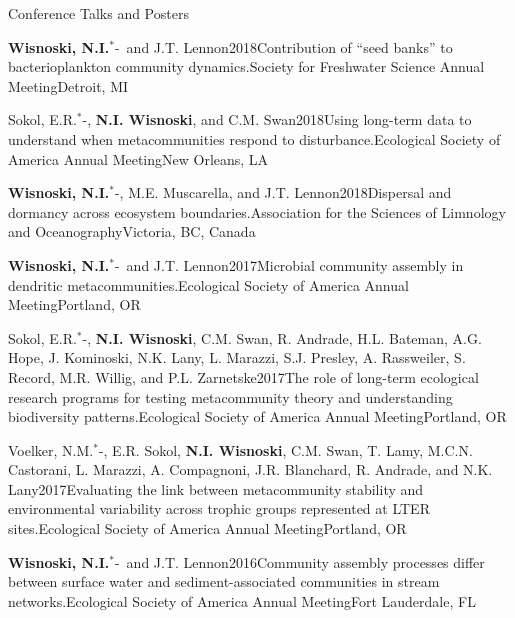 \documentclass{resume} %
\newcommand{\Star}{\ensuremath{^*}\kern-\scriptspace}
\begin{document}
\begin{rhangSection}{Conference Talks and Posters}
\begin{Presentation}{{\bf Wisnoski, N.I.}\Star\ and J.T. Lennon}{2018}{Contribution of \enquote{seed banks} to bacterioplankton community dynamics.}{Society for Freshwater Science Annual Meeting}{Detroit, MI}
\end{Presentation}
  
\begin{Presentation}{Sokol, E.R.\Star, {\bf N.I. Wisnoski}, and C.M. Swan}{2018}{Using long-term data to understand when metacommunities respond to disturbance.}{Ecological Society of America Annual Meeting}{New Orleans, LA}
\end{Presentation}

\begin{Presentation}{{\bf Wisnoski, N.I.}\Star, M.E. Muscarella, and J.T. Lennon}{2018}{Dispersal and dormancy across ecosystem boundaries.}{Association for the Sciences of Limnology and Oceanography}{Victoria, BC, Canada}
\end{Presentation}

\begin{Presentation}{{\bf Wisnoski, N.I.}\Star\ and J.T. Lennon}{2017}{Microbial community assembly in dendritic metacommunities.}{Ecological Society of America Annual Meeting}{Portland, OR}
\end{Presentation}
  
\begin{Presentation}{Sokol, E.R.\Star, {\bf N.I. Wisnoski}, C.M. Swan, R. Andrade, H.L. Bateman, A.G. Hope, J. Kominoski, N.K. Lany, L. Marazzi, S.J. Presley, A. Rassweiler, S. Record, M.R. Willig, and P.L. Zarnetske}{2017}{The role of long-term ecological research programs for testing metacommunity theory and understanding biodiversity patterns.}{Ecological Society of America Annual Meeting}{Portland, OR}
\end{Presentation}
  
\begin{Presentation}{Voelker, N.M.\Star, E.R. Sokol, {\bf N.I. Wisnoski}, C.M. Swan, T. Lamy, M.C.N. Castorani, L. Marazzi, A. Compagnoni, J.R. Blanchard, R. Andrade, and N.K. Lany}{2017}{Evaluating the link between metacommunity stability and environmental variability across trophic groups represented at LTER sites.}{Ecological Society of America Annual Meeting}{Portland, OR}
\end{Presentation}

\begin{Presentation}{{\bf Wisnoski, N.I.}\Star\ and J.T. Lennon}{2016}{Community assembly processes differ between surface water and sediment-associated communities in stream networks.}{Ecological Society of America Annual Meeting}{Fort Lauderdale, FL}
\end{Presentation}


\end{rhangSection}
\end{document}
